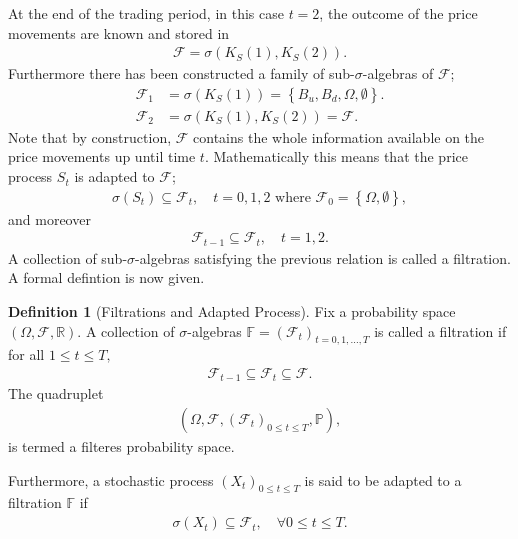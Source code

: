 \documentclass{article}
\theoremstyle{definition}
\newtheorem{definition}[theorem]{Definition}
\numberwithin{equation}{section}
\begin{document}
At the end of the trading period, in this case $t = 2$, the outcome of the price movements are known and stored in
\begin{align}
    \mathscr{F} = \sigma\left(K_S(1), K_S(2)\right).
\end{align}
Furthermore there has been constructed a family of sub-$\sigma$-algebras of $\mathscr{F}$;
\begin{align}
    \mathscr{F}_1 &= \sigma(K_S(1)) = \left\{B_u, B_d, \Omega, \emptyset\right\}. \\
    \mathscr{F}_2 &= \sigma(K_S(1), K_S(2)) = \mathscr{F}.
\end{align}
Note that by construction, $\mathscr{F}$ contains the whole information available on the price movements up until time $t$.
Mathematically this means that the price process $S_t$ is adapted to $\mathscr{F}$;
\begin{align}
    \sigma(S_t) \subseteq \mathscr{F}_t, \quad  t = 0,1,2 \text{ where } \mathscr{F}_0 = \left\{ \Omega, \emptyset \right\},
\end{align}
and moreover
\begin{align}
    \mathscr{F}_{t - 1} \subseteq \mathscr{F}_t, \quad t = 1,2.
\end{align}
A collection of sub-$\sigma$-algebras satisfying the previous relation is called a filtration.
A formal defintion is now given.
\begin{definition}[Filtrations and Adapted Process]
    Fix a probability space $(\Omega, \mathscr{F}, \mathbb{R})$.
    A collection of $\sigma$-algebras $\mathbb{F} = \left(\mathscr{F}_t\right)_{t = 0,1,\ldots,T}$ is called a filtration if for all $1 \leq t \leq T,$
    \begin{align}
        \mathscr{F}_{t - 1} \subseteq \mathscr{F}_{t} \subseteq \mathscr{F}.
    \end{align}
    The quadruplet
    \begin{align}
        (\Omega, \mathscr{F}, \left(\mathscr{F}_t\right)_{0 \leq t \leq T}, \mathbb{P}),
    \end{align}
    is termed a filteres probability space.
    
    Furthermore, a stochastic process $(X_t)_{0 \leq t \leq T}$ is said to be adapted to a filtration $\mathbb{F}$ if
    \begin{align}
        \sigma(X_t) \subseteq \mathscr{F}_t, \quad \forall 0 \leq t \leq T.
    \end{align}
\end{definition}
\end{document}

